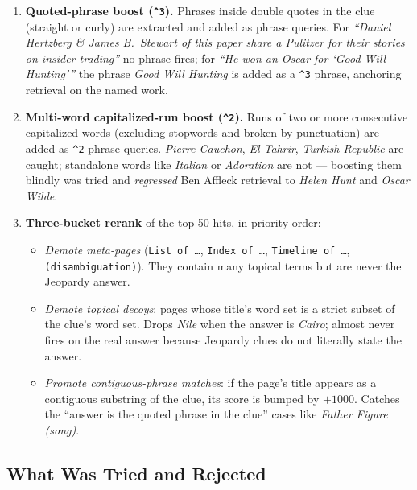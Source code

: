\documentclass[11pt]{article}
\begin{document}
\begin{enumerate}
  \item \textbf{Quoted-phrase boost (\texttt{\^{}3}).} Phrases inside double
        quotes in the clue (straight or curly) are extracted and added as
        phrase queries. For \emph{``Daniel Hertzberg \& James B.\ Stewart of
        this paper share a Pulitzer for their stories on insider trading''} no
        phrase fires; for \emph{``He won an Oscar for `Good Will Hunting'''} the
        phrase \emph{Good Will Hunting} is added as a \texttt{\^{}3} phrase,
        anchoring retrieval on the named work.

  \item \textbf{Multi-word capitalized-run boost (\texttt{\^{}2}).} Runs of two
        or more consecutive capitalized words (excluding stopwords and broken by
        punctuation) are added as \texttt{\^{}2} phrase queries.
        \emph{Pierre Cauchon}, \emph{El Tahrir}, \emph{Turkish Republic} are
        caught; standalone words like \emph{Italian} or \emph{Adoration} are
        not --- boosting them blindly was tried and \emph{regressed} Ben Affleck
        retrieval to \emph{Helen Hunt} and \emph{Oscar Wilde}.

  \item \textbf{Three-bucket rerank} of the top-50 hits, in priority order:
        \begin{itemize}
          \item \emph{Demote meta-pages} (\texttt{List of \ldots},
                \texttt{Index of \ldots}, \texttt{Timeline of \ldots},
                \texttt{(disambiguation)}). They contain many topical terms but
                are never the Jeopardy answer.
          \item \emph{Demote topical decoys}: pages whose title's word set is a
                strict subset of the clue's word set. Drops \emph{Nile} when
                the answer is \emph{Cairo}; almost never fires on the real
                answer because Jeopardy clues do not literally state the answer.
          \item \emph{Promote contiguous-phrase matches}: if the page's title
                appears as a contiguous substring of the clue, its score is
                bumped by $+1000$. Catches the ``answer is the quoted phrase in
                the clue'' cases like \emph{Father Figure (song)}.
        \end{itemize}
\end{enumerate}

\subsection{What Was Tried and Rejected}
\end{document}
